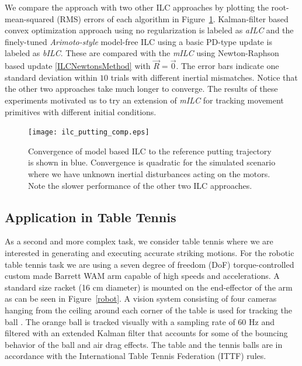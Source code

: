 We compare the approach with two other ILC approaches by plotting the root-mean-squared (RMS) errors of each algorithm in Figure~\ref{ILCTrajectoryPutting}. Kalman-filter based convex optimization approach \cite{Schoellig12} using no regularization is labeled as \emph{aILC} and the finely-tuned \emph{Arimoto-style} \cite{Arimoto84} model-free ILC using a basic PD-type update is labeled as \emph{bILC}. These are compared with the \emph{mILC} using Newton-Raphson based update \eqref{ILCNewtonsMethod} with $\vec{R} = \vec{0}$. The error bars indicate one standard deviation within $10$ trials with different inertial mismatches. Notice that the other two approaches take much longer to converge. The results of these experiments motivated us to try an extension of \emph{mILC} for tracking movement primitives with different initial conditions.

\begin{figure}
\centering
\texttt{[image: ilc\_putting\_comp.eps]}
\caption{Convergence of model based ILC to the reference putting trajectory is shown in blue. Convergence is quadratic for the simulated scenario where we have unknown inertial disturbances acting on the motors. Note the slower performance of the other two ILC approaches.}
\label{ILCTrajectoryPutting}
\end{figure}


\subsection{Application in Table Tennis}


As a second and more complex task, we consider table tennis where we are interested in generating and executing accurate striking motions. For the robotic table tennis task we are using a seven degree of freedom (DoF) torque-controlled custom made Barrett WAM arm capable of high speeds and accelerations. A standard size racket (16 cm diameter) is mounted on the end-effector of the arm as can be seen in Figure~\ref{robot}. A vision system consisting of four cameras hanging from the ceiling around each corner of the table is used for tracking the ball \cite{Lampert12}. The orange ball is tracked  visually with a sampling rate of 60 Hz and filtered with an extended Kalman filter that accounts for some of the bouncing behavior of the ball and air drag effects. The table and the tennis balls are in accordance with the International Table Tennis Federation (ITTF) rules.

